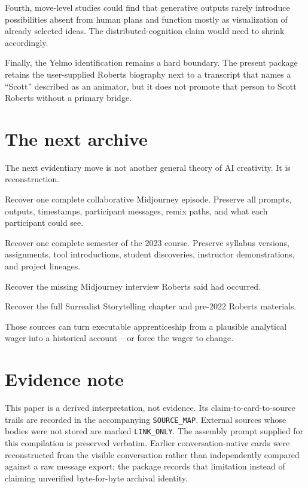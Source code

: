 \documentclass[11pt]{article}
\begin{document}
Fourth, move-level studies could find that generative outputs rarely introduce possibilities absent from human plans and function mostly as visualization of already selected ideas. The distributed-cognition claim would need to shrink accordingly.

Finally, the Yelmo identification remains a hard boundary. The present package retains the user-supplied Roberts biography next to a transcript that names a ``Scott'' described as an animator, but it does not promote that person to Scott Roberts without a primary bridge.

\section{The next archive}

The next evidentiary move is not another general theory of AI creativity. It is reconstruction.

Recover one complete collaborative Midjourney episode. Preserve all prompts, outputs, timestamps, participant messages, remix paths, and what each participant could see.

Recover one complete semester of the 2023 course. Preserve syllabus versions, assignments, tool introductions, student discoveries, instructor demonstrations, and project lineages.

Recover the missing Midjourney interview Roberts said had occurred.

Recover the full Surrealist Storytelling chapter and pre-2022 Roberts materials.

Those sources can turn executable apprenticeship from a plausible analytical wager into a historical account -- or force the wager to change.

\section*{Evidence note}

This paper is a derived interpretation, not evidence. Its claim-to-card-to-source trails are recorded in the accompanying \texttt{SOURCE\_MAP}. External sources whose bodies were not stored are marked \texttt{LINK\_ONLY}. The assembly prompt supplied for this compilation is preserved verbatim. Earlier conversation-native cards were reconstructed from the visible conversation rather than independently compared against a raw message export; the package records that limitation instead of claiming unverified byte-for-byte archival identity.
\end{document}
